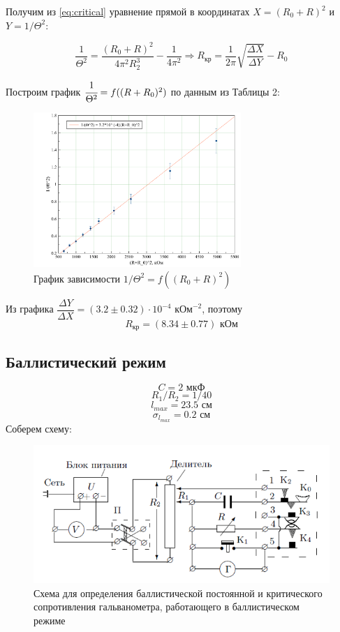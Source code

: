 \documentclass[a4paper, 12pt]{article}
\begin{document}
Получим из \ref{eq:critical} уравнение прямой в координатах $X = (R_0 + R)^2$ и $Y = 1/\Theta^2$:

$$\dfrac{1}{\Theta^2} = \dfrac{(R_0 + R)^2}{4 \pi^2 R_2^3} - \dfrac{1}{4 \pi^2}\Rightarrow R_\text{кр} = \dfrac{1}{2 \pi} \sqrt{\dfrac{\Delta X}{\Delta Y}} - R_0$$


Построим график $\cfrac{1}{\Theta^2}=f((R+R_0)^2)$ по данным из Таблицы 2:
\begin {figure}[H]
	\begin{center}
\includegraphics[width = 0.7\textwidth]{plot2}
		\caption{График зависимости $1/\Theta^2 = f((R_0 + R)^2)$}
	\end{center}
\end {figure}


Из графика $\dfrac{\Delta Y}{\Delta X} = (3.2 \pm 0.32)\cdot10^{-4}\text{ кОм}^{-2}$, поэтому 
$$\boxed{R_\text{кр} = (8.34 \pm 0.77) \text{  кОм}}$$

\subsection*{Баллистический режим}

$$C = 2 \text{ мкФ}$$
$$R_1/R_2 = 1/40$$
$$l_{max} = 23.5 \text{ см}$$
$$\sigma_{l_{max}}=0.2 \text{ см}$$
Соберем схему:

\begin {figure}[H]
	\begin{center}
		\includegraphics[width = 0.8 \textwidth]{Scheme2}
		\caption{Схема для определения баллистической постоянной и критического сопротивления гальванометра, работающего в баллистическом режиме}
	\end{center}
\end {figure}
\end{document}
